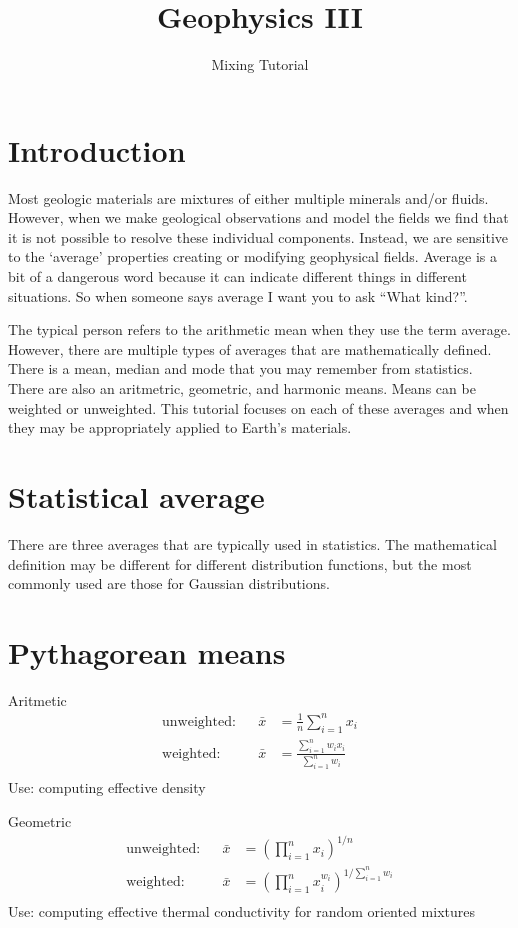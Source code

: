 \documentclass[final,a4paper,12pt]{article}
\title{Geophysics III}
\author{Mixing Tutorial}
\date{}
\theoremstyle{definition}
\begin{document}
\maketitle

\section{Introduction}
Most geologic materials are mixtures of either multiple minerals and/or fluids.
However, when we make geological observations and model the fields we find that
it is not possible to resolve these individual components.  Instead, we are
sensitive to the `average' properties creating or modifying geophysical fields.
Average is a bit of a dangerous word because it can indicate different things in
different situations.  So when someone says average I want you to ask ``What
kind?''.

The typical person refers to the arithmetic mean when they use the term average.
However, there are multiple types of averages that are mathematically defined.
There is a mean, median and mode that you may remember from statistics.  There
are also an aritmetric, geometric, and harmonic means.  Means can be weighted or
unweighted.  This tutorial focuses on each of these averages and when they may
be appropriately applied to Earth's materials.

\section{Statistical average}
There are three averages that are typically used in statistics.  The
mathematical definition may be different for different distribution functions,
but the most commonly used are those for Gaussian distributions.

\section{Pythagorean means}

Aritmetic
\begin{align}
    \text{unweighted:} && \bar{x} &= \frac{1}{n} \sum_{i=1}^{n} x_i \\
    \text{weighted:} &&
        \bar{x} &= \frac{\sum_{i=1}^{n} w_i x_i}{\sum_{i=1}^{n} w_i} \\
\end{align}
Use: computing effective density

Geometric
\begin{align}
    \text{unweighted:} && \bar{x} &= \left( \prod_{i=1}^{n} x_i \right)^{1/n} \\
    \text{weighted:} && \bar{x} &= 
        \left( \prod_{i=1}^{n} x_i^{w_i} \right)^{1/\sum_{i=1}^{n} w_i} \\
\end{align}
Use: computing effective thermal conductivity for random oriented mixtures
\end{document}
